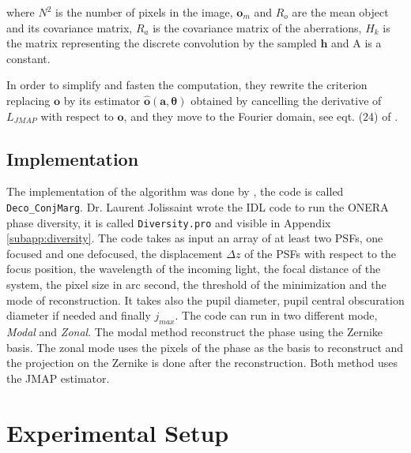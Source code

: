 where $N^2$ is the number of pixels in the image, $\mathbf{o}_m$ and $R_o$ are the mean object and its covariance matrix, $R_a$ is the covariance matrix of the aberrations, $H_k$ is the matrix representing the discrete convolution by the sampled $\mathbf{h}$ and A is a constant.

In order to simplify and fasten the computation, they rewrite the criterion replacing $\mathbf{o}$ by its estimator $\hat{\mathbf{o}}(\mathbf{a},\boldsymbol{\theta})$ obtained by cancelling the derivative of $L_{JMAP}$ with respect to $\mathbf{o}$, and they move to the Fourier domain, see eqt. (24) of \citet[p.21]{mugnier_2006}.

\subsection{Implementation}
\label{subsec:OneraAlgoImp}

The implementation of the algorithm was done by \citet{mugnier_2006}, the code is called \verb!Deco_ConjMarg!. Dr. Laurent Jolissaint wrote the IDL code to run the ONERA phase diversity, it is called \verb!Diversity.pro! and visible in Appendix \ref{subapp:diversity}. The code takes as input an array of at least two PSFs, one focused and one defocused, the displacement $\Delta z$ of the PSFs with respect to the focus position, the wavelength of the incoming light, the focal distance of the system, the pixel size in arc second, the threshold of the minimization and the mode of reconstruction. It takes also the pupil diameter, pupil central obscuration diameter if needed and finally $j_{max}$. The code can run in two different mode, \textit{Modal} and \textit{Zonal}. The modal method reconstruct the phase using the Zernike basis. The zonal mode uses the pixels of the phase as the basis to reconstruct and the projection on the Zernike is done after the reconstruction. Both method uses the JMAP estimator.

\section{Experimental Setup}
\label{sec:ExpSetup}

